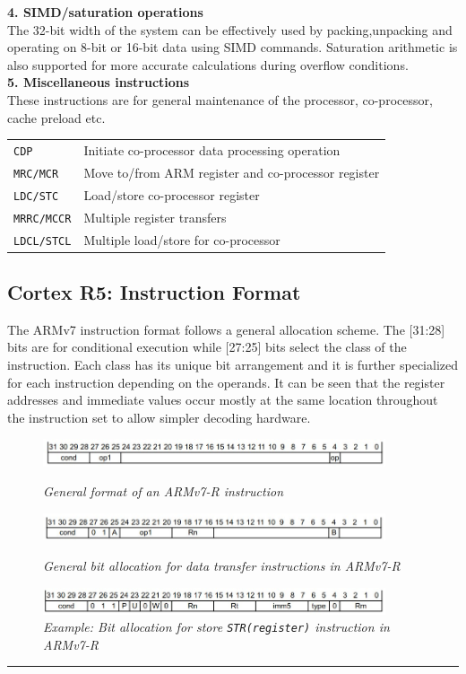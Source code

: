 \documentclass[a4paper,11pt]{article}
\begin{document}
\textbf{4. SIMD/saturation operations}\\
The 32-bit width of the system can be effectively used by packing,unpacking and operating on 8-bit or 16-bit data using SIMD commands. Saturation arithmetic is also supported for more accurate calculations during overflow conditions.\\
\textbf{5. Miscellaneous instructions}\\
These instructions are for general maintenance of the processor, co-processor, cache preload etc.
\begin{tabular}{l l}
{\tt CDP} & Initiate co-processor data processing operation\\
{\tt MRC/MCR} & Move to/from ARM register and co-processor register\\
{\tt LDC/STC} & Load/store co-processor register\\
{\tt MRRC/MCCR} & Multiple register transfers\\
{\tt LDCL/STCL} & Multiple load/store for co-processor\\
\end{tabular}
\subsection{Cortex R5: Instruction Format}
The ARMv7 instruction format follows a general allocation scheme. The [31:28] bits are for conditional execution while [27:25] bits select the class of the instruction. Each class has its unique bit arrangement and it is further specialized for each instruction depending on the operands. It can be seen that the register addresses and immediate values occur mostly at the same location throughout the instruction set to allow simpler decoding hardware.
\begin{figure}[H]
\center
\includegraphics[width=0.90\textwidth]{figures/CortexFormatGen.jpg}
\caption{{\small \textit{General format of an ARMv7-R instruction}}\cite{ARMref}}
\includegraphics[width=0.90\textwidth]{figures/CortexLDR.jpg}
\caption{{\small \textit{General bit allocation for data transfer instructions in ARMv7-R}}\cite{ARMref}}
\includegraphics[width=0.90\textwidth]{figures/CortexSTR.jpg}
\caption{{\small \textit{Example: Bit allocation for store {\tt STR(register)} instruction in ARMv7-R}}\cite{ARMref}}
\end{figure}
\vspace{1cm}\hrule
\end{document}
